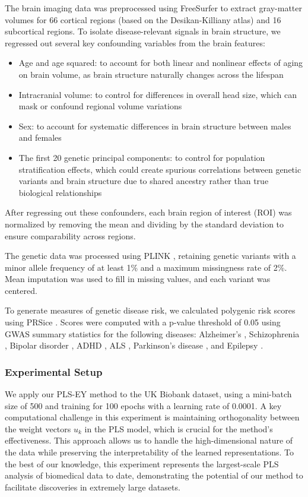 The brain imaging data was preprocessed using FreeSurfer \citep{Fischl2012} to extract gray-matter volumes for 66 cortical regions (based on the Desikan-Killiany atlas) and 16 subcortical regions. To isolate disease-relevant signals in brain structure, we regressed out several key confounding variables from the brain features:
\begin{itemize}
    \item Age and age squared: to account for both linear and nonlinear effects of aging on brain volume, as brain structure naturally changes across the lifespan \citep{fjell2009high}
    \item Intracranial volume: to control for differences in overall head size, which can mask or confound regional volume variations \citep{voevodskaya2014effects}
    \item Sex: to account for systematic differences in brain structure between males and females \citep{ruigrok2014meta}
    \item The first 20 genetic principal components: to control for population stratification effects, which could create spurious correlations between genetic variants and brain structure due to shared ancestry rather than true biological relationships \citep{price2006principal}
\end{itemize}

After regressing out these confounders, each brain region of interest (ROI) was normalized by removing the mean and dividing by the standard deviation to ensure comparability across regions.

The genetic data was processed using PLINK \citep{Purcell2007}, retaining genetic variants with a minor allele frequency of at least 1\% and a maximum missingness rate of 2\%. Mean imputation was used to fill in missing values, and each variant was centered.

To generate measures of genetic disease risk, we calculated polygenic risk scores using PRSice \citep{PRSice2014}. Scores were computed with a p-value threshold of 0.05 using GWAS summary statistics for the following diseases: Alzheimer's \citep{Lambert2013}, Schizophrenia \citep{Trubetskoy2022}, Bipolar disorder \citep{Mullins2021}, ADHD \citep{Demontis2023}, ALS \citep{Van_Rheenen2021}, Parkinson's disease \citep{Nalls2019}, and Epilepsy \citep{International_League_Against_Epilepsy_Consortium_on_Complex_Epilepsies2018}.
\subsubsection{Experimental Setup}
We apply our PLS-EY method to the UK Biobank dataset, using a mini-batch size of 500 and training for 100 epochs with a learning rate of 0.0001. A key computational challenge in this experiment is maintaining orthogonality between the weight vectors $u_k$ in the PLS model, which is crucial for the method's effectiveness.
This approach allows us to handle the high-dimensional nature of the data while preserving the interpretability of the learned representations. To the best of our knowledge, this experiment represents the largest-scale PLS analysis of biomedical data to date, demonstrating the potential of our method to facilitate discoveries in extremely large datasets.
